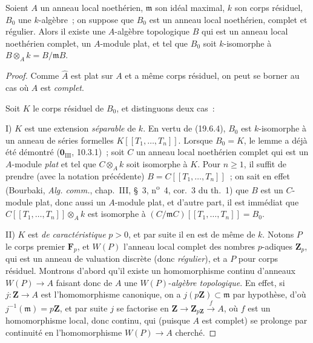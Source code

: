 \begin{lemma}[19.7.1.3]
\label{0.19.7.1.3-fr}
Soient $A$ un anneau local noethérien, $\mathfrak m$ son idéal maximal, $k$ son
corps résiduel, $B_0$ une $k$-algèbre~; on suppose que $B_0$ est un anneau
local noethérien, complet et \textup{régulier}. Alors il existe une $A$-algèbre
topologique $B$ qui est un anneau local noethérien complet, un $A$-module \textup{plat},
et tel que $B_0$ soit $k$-isomorphe à
$B\otimes_A k=B/\mathfrak mB$.
\end{lemma}

\begin{proof}
Comme $\widehat A$ est plat sur $A$ et a même corps résiduel, on peut se borner
au cas où $A$ est \emph{complet}.

Soit $K$ le corps résiduel de $B_0$, et distinguons deux cas~:

\medskip
\noindent I) $K$ est une extension \emph{séparable} de $k$. En vertu de
(19.6.4), $B_0$ est $k$-isomorphe à un anneau de séries formelles
$K[[T_1,\ldots,T_n]]$. Lorsque $B_0=K$, le lemme a déjà été démontré
($\mathbf 0_{\mathrm{III}}$, 10.3.1)~; soit $C$ un anneau local noethérien
complet qui est un $A$-module \emph{plat} et tel que $C\otimes_A k$ soit isomorphe à
$K$. Pour $n\geq1$, il suffit de prendre (avec la notation précédente)
$B=C[[T_1,\ldots,T_n]]$~; on sait en effet (Bourbaki,
\emph{Alg. comm.}, chap.~III, §~3, n\textsuperscript{o}~4, cor.~3 du th.~1)
que $B$ est un $C$-module plat, donc aussi un $A$-module plat, et d'autre part,
il est immédiat que $C[[T_1,\ldots,T_n]]\otimes_A k$ est isomorphe à
$(C/\mathfrak mC)[[T_1,\ldots,T_n]]=B_0$.

\medskip
\noindent II) $K$ est \emph{de caractéristique} $p>0$, et par suite il en est
de même de $k$. Notons $P$ le corps premier $\mathbf F_p$, et $W(P)$ l'anneau
local complet des nombres $p$-adiques $\mathbf Z_p$, qui est un anneau de
valuation discrète (donc \emph{régulier}), et a $P$ pour corps résiduel.
Montrons d'abord qu'il existe un homomorphisme continu d'anneaux $W(P)\to A$
faisant donc de $A$ une $W(P)$-\emph{algèbre topologique}. En effet, si
$j:\mathbf Z\to A$ est l'homomorphisme canonique, on a
$j(p\mathbf Z)\subset\mathfrak m$ par hypothèse, d'où
$j^{-1}(\mathfrak m)=p\mathbf Z$, et par suite $j$ se factorise en
$\mathbf Z\to\mathbf Z_{p\mathbf Z}\xrightarrow{f}A$, où $f$ est un
homomorphisme local, donc continu, qui (puisque $A$ est complet) se prolonge
par continuité en l'homomorphisme $W(P)\to A$ cherché.


\end{proof}
